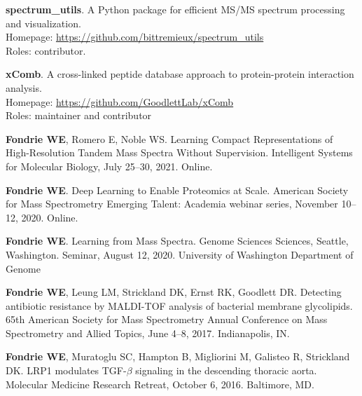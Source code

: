 \documentclass[11pt]{article}
\newcommand{\mysection}[1]{\vspace{1ex \textbf{\large \textrm{#1}} \quad
    \hrulefill}}
\newcommand{\myref}[1]{\href{#1}{\url{#1}}}
\begin{document}
\begin{etaremune}
  \item \textbf{spectrum\_utils}. A Python package for efficient MS/MS spectrum
  processing and visualization. \\
  Homepage: \myref{https://github.com/bittremieux/spectrum_utils} \\
  Roles: contributor.

  \item \textbf{xComb}. A cross-linked peptide database approach to
  protein-protein interaction analysis. \\
  Homepage: \myref{https://github.com/GoodlettLab/xComb} \\
  Roles: maintainer and contributor

\end{etaremune}

\mysection{Talks}
\begin{etaremune}
  \item \textbf{Fondrie WE}, Romero E, Noble WS. Learning Compact
  Representations of High-Resolution Tandem Mass Spectra Without Supervision.
  Intelligent Systems for Molecular Biology, July 25--30, 2021. Online.

  \item \textbf{Fondrie WE}. Deep Learning to Enable Proteomics at Scale.
  American Society for Mass Spectrometry Emerging Talent: Academia webinar
  series, November 10--12, 2020. Online.
  
  \item \textbf{Fondrie WE}. Learning from Mass Spectra. Genome Sciences
  Sciences, Seattle, Washington. Seminar, August 12, 2020. University of
  Washington Department of Genome
  
  \item \textbf{Fondrie WE}, Leung LM, Strickland DK, Ernst RK, Goodlett DR.
  Detecting antibiotic resistance by MALDI-TOF analysis of bacterial membrane
  glycolipids. 65th American Society for Mass Spectrometry Annual Conference on
  Mass Spectrometry and Allied Topics, June 4--8, 2017. Indianapolis, IN.
    
  \item \textbf{Fondrie WE}, Muratoglu SC, Hampton B, Migliorini M, Galisteo R,
  Strickland DK. LRP1 modulates TGF-$\beta$ signaling in the descending
  thoracic aorta. Molecular Medicine Research Retreat, October 6, 2016.
  Baltimore, MD.
\end{etaremune}
\end{document}
